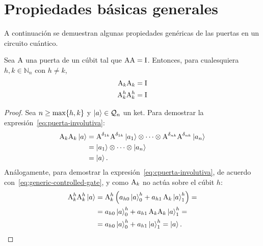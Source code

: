 \section{Propiedades básicas generales}
A continuación se demuestran algunas propiedades genéricas de las puertas en un circuito cuántico.
\begin{proposition}
  Sea $\text{A}$ una puerta de un cúbit tal que $\text{A}\text{A}=\text{I}$. Entonces, para cualesquiera $h,k \in \mathbb{N}_n$ con $h\neq k$,
  \begin{align}
    \label{eq:puerta-involutiva}
    \text{A}_k\text{A}_k                   & = \text{I} \\
    \label{eq:cpuerta-involutiva}
    \text{A}^{h}_{k}\text{A}^{h}_{k} & = \text{I}
  \end{align}
\end{proposition}
\begin{proof}
  Sea $n\geq\max\{h,k\}$ y $\ket{a}\in\mathcal{Q}_n$ un ket.
  Para demostrar la expresión~\eqref{eq:puerta-involutiva}:
  \begin{align*}
    \text{A}_k\text{A}_k\ket{a}
     & = \text{A}^{\delta_{1k}}\text{A}^{\delta_{1k}}\ket{a_1}\otimes\cdots\otimes\text{A}^{\delta_{nk}}\text{A}^{\delta_{nk}}\ket{a_n} \\
     & = \ket{a_1}\otimes\cdots\otimes\ket{a_n}                                                                                        \\
     & = \ket{a}.
  \end{align*}
  Análogamente, para demostrar la expresión~\eqref{eq:cpuerta-involutiva}, de acuerdo con~\eqref{eq:generic-controlled-gate}, y como $\text{A}_k$ no actúa sobre el cúbit $h$:
  \begin{align*}
    \text{A}^{h}_{k}\text{A}^{h}_{k}\ket{a}
     & =\text{A}^{h}_{k}\left(a_{h0}\ket{a}^{h}_{0}+a_{h1}\,\text{A}_k\ket{a}^{h}_{1}\right)= \\
     & =a_{h0}\ket{a}^{h}_{0}+a_{h1}\,\text{A}_k\text{A}_k\ket{a}^{h}_{1}=                      \\
     & =a_{h0}\ket{a}^{h}_{0}+a_{h1}\ket{a}^{h}_{1}=\ket{a}.
  \end{align*}
\end{proof}

